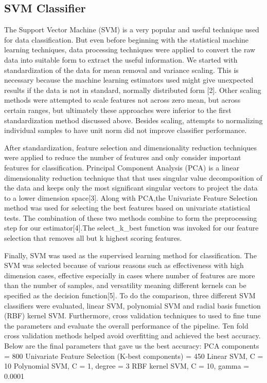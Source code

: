 \documentclass{article} %
\begin{document}
\subsection{SVM Classifier}
The Support Vector Machine (SVM) is a very popular and useful technique used for data classification. But even before beginning with the statistical machine learning techniques, data processing techniques were applied to convert the raw data into suitable form to extract the useful information. We started with standardization of the data for mean removal and variance scaling. This is necessary because the machine learning estimators used might give unexpected results if the data is not in standard, normally distributed form [2]. Other scaling methods were attempted to scale features not across zero mean, but across certain ranges, but ultimately these approaches were inferior to the first standardization method discussed above. Besides scaling, attempts to normalizing individual samples to have unit norm did not improve classifier performance. 

After standardization, feature selection and dimensionality reduction techniques were applied to reduce the number of features and only consider important features for classification. Principal Component Analysis (PCA) is a linear dimensionality reduction technique that that uses singular value decomposition of the data and keeps only the most significant singular vectors to project the data to a lower dimension space[3]. Along with PCA,the Univariate Feature Selection method was used for selecting the best features based on univariate statistical tests. The combination of these two methods combine to form the preprocessing step for our estimator[4].The select\_k\_best function was invoked for our feature selection that removes all but k highest scoring features.

Finally, SVM was used as the supervised learning method for classification. The SVM was selected because of various reasons such as effectiveness with high dimension cases, effective especially in cases where number of features are more than the number of samples, and versatility meaning different kernels can be specified as the decision function[5]. To do the comparison, three different SVM classifiers were evaluated, linear SVM, polynomial SVM and radial basis function (RBF) kernel SVM. Furthermore, cross validation techniques to used to fine tune the parameters and evaluate the overall performance of the pipeline. Ten fold cross validation methods helped avoid overfitting and achieved the best accuracy. Below are the final parameters that gave us the best accuracy:
PCA components = 800
Univariate Feature Selection (K-best components) = 450
Linear SVM, C = 10
Polynomial SVM, C = 1, degree = 3
RBF kernel SVM, C = 10, gamma = 0.0001
\end{document}
